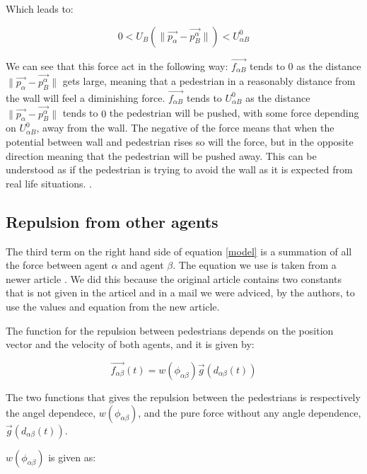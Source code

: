 Which leads to:

\begin{equation}
0< U_{B} \left( \| \vec{p_{\alpha}} - \vec{p_{B}^{\alpha}} \| \right) < U^0_{\alpha B}
\end{equation}

We can see that this force act in the following way: $\vec{f_{\alpha B}}$ tends to 0 as the distance 
$\| \vec{p_{\alpha}} - \vec{p_{B}^{\alpha}} \|$ gets large, meaning that a pedestrian in a reasonably 
distance from the wall will feel a diminishing force. $\vec{f_{\alpha B}}$ tends to $U^0_{\alpha B}$ 
as the distance $ \| \vec{p_{\alpha}} - \vec{p_{B}^{\alpha}} \|$ tends to $0$ the pedestrian will be 
pushed, with some force depending on $U^0_{\alpha B}$, away from the wall. The negative of the force 
means that when the potential between wall and pedestrian rises so will the force, but in the opposite 
direction meaning that the pedestrian will be pushed away. This can be understood as if the pedestrian 
is trying to avoid the wall as it is expected from real life situations. \cite{social-force}. %

\subsection{Repulsion from other agents}
The third term on the right hand side of equation \eqref{model} is a summation of all the 
force between agent $\alpha$ and agent $\beta$. The equation we use is taken from a newer article \cite{ABconstant}. We did this because the original article contains two constants that is not given in the articel and in a mail we were adviced, by the authors, to use the values and equation from the new article. 

The function for the repulsion between pedestrians depends on the position vector and the velocity of 
both agents, and it is given by:

\begin{equation}
        \vec{f_{\alpha \beta }}\left( t \right) = w\left(\phi_{\alpha \beta}\right)\vec{g}\left(d_{\alpha \beta}(t)\right)
    \label{eq:agentinteraction}
\end{equation}

The two functions that gives the repulsion between the pedestrians is respectively the angel dependece, $ w\left(\phi_{\alpha \beta}\right)$, and the pure force without any angle dependence, $\vec{g}\left(d_{\alpha \beta}(t)\right)$.

$ w\left(\phi_{\alpha \beta}\right)$ is given as: 

